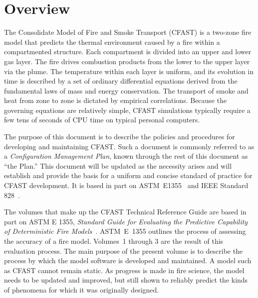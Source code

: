 \documentclass[12pt]{book}
\begin{document}
\tableofcontents

\listoffigures


\mainmatter

\chapter{Overview}

The Consolidate Model of Fire and Smoke Transport (CFAST) is a two-zone fire model that predicts the thermal environment caused by a fire within a compartmented structure. Each compartment is divided into an upper and lower gas layer. The fire drives combustion products from the lower to the upper layer via the plume. The temperature within each layer is uniform, and its evolution in time is described by a set of ordinary differential equations derived from the fundamental laws of mass and energy conservation. The transport of smoke and heat from zone to zone is dictated by empirical correlations. Because the governing equations are relatively simple, CFAST simulations typically require a few tens of seconds of CPU time on typical personal computers.

The purpose of this document is to describe the policies and procedures for developing and maintaining CFAST. Such a document is commonly referred to as a {\em Configuration Management Plan}, known through the rest of this document as ``the Plan.'' This document will be updated as the necessity arises and will establish and provide the basis for a uniform and concise standard of practice for CFAST development. It is based in part on  ASTM~E1355~\cite{ASTM:E1355} and IEEE Standard 828~\cite{IEEE-828}.

The volumes that make up the CFAST Technical Reference Guide are based in part on ASTM E 1355, {\em Standard Guide for Evaluating the Predictive Capability of Deterministic Fire Models}~\cite{ASTM:E1355}. ASTM~E~1355 outlines the process of assessing the accuracy of a fire model. Volumes~1 through 3 are the result of this evaluation process. The main purpose of the present volume is to describe the process by which the model software is developed and maintained. A model such as CFAST cannot remain static. As progress is made in fire science, the model needs to be updated and improved, but still shown to reliably predict the kinds of phenomena for which it was originally designed.
\end{document}

